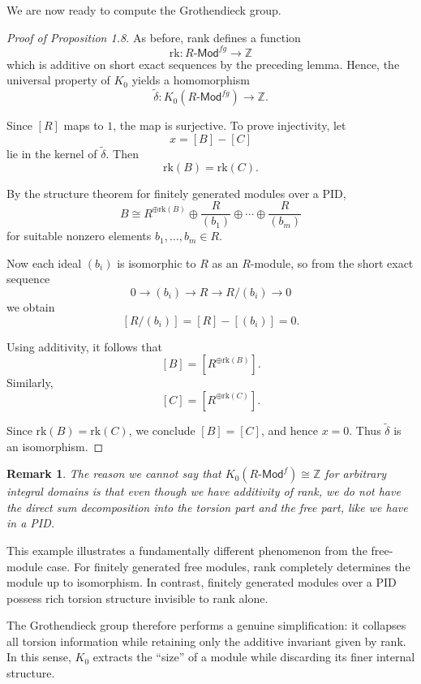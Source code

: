 \documentclass[12pt,reqno]{amsart}
\theoremstyle{plain}
\newtheorem{rem}[thm]{Remark}
\numberwithin{equation}{section}
\begin{document}
We are now ready to compute the Grothendieck group.

\begin{proof}[Proof of Proposition 1.8]
As before, rank defines a function
\[
\mathrm{rk}:R\textsf{-Mod}^{fg}\to \mathbb Z
\]
which is additive on short exact sequences by the preceding lemma. Hence, the universal property of $K_0$ yields a homomorphism
\[
\widetilde\delta:
K_0(R\textsf{-Mod}^{fg})
\to
\mathbb Z.
\]

Since $[R]$ maps to $1$, the map is surjective.
To prove injectivity, let
\[
x=[B]-[C]
\]
lie in the kernel of $\widetilde\delta$. Then
\[
\mathrm{rk}(B)=\mathrm{rk}(C).
\]

By the structure theorem for finitely generated modules over a PID,
\[
B
\cong
R^{\oplus \mathrm{rk}(B)}
\oplus
\frac{R}{(b_1)}
\oplus\cdots\oplus
\frac{R}{(b_m)}
\]
for suitable nonzero elements $b_1,\dots,b_m\in R$.

Now each ideal $(b_i)$ is isomorphic to $R$ as an $R$-module, so from the short exact sequence
\[
0\longrightarrow (b_i)\longrightarrow R\longrightarrow R/(b_i)\longrightarrow 0
\]
we obtain
\[
[R/(b_i)]=[R]-[(b_i)]=0.
\]

Using additivity, it follows that
\[
[B]=[R^{\oplus \mathrm{rk}(B)}].
\]
Similarly,
\[
[C]=[R^{\oplus \mathrm{rk}(C)}].
\]

Since $\mathrm{rk}(B)=\mathrm{rk}(C)$, we conclude $[B]=[C]$, and hence $x=0$.
Thus $\widetilde\delta$ is an isomorphism.
\end{proof}


\begin{rem}\label{rem: PID is neccasary}
    The reason we cannot say that $K_0(R\textsf{-Mod}^f)\cong \mathbb Z$ for arbitrary integral domains is that even though we have additivity of rank, we do not have the direct sum decomposition into the torsion part and the free part, like we have in a PID.
\end{rem}

This example illustrates a fundamentally different phenomenon from the free-module case. For finitely generated free modules, rank completely determines the module up to isomorphism. In contrast, finitely generated modules over a PID possess rich torsion structure invisible to rank alone.

The Grothendieck group therefore performs a genuine simplification: it collapses all torsion information while retaining only the additive invariant given by rank. In this sense, $K_0$ extracts the ``size'' of a module while discarding its finer internal structure.
\end{document}
